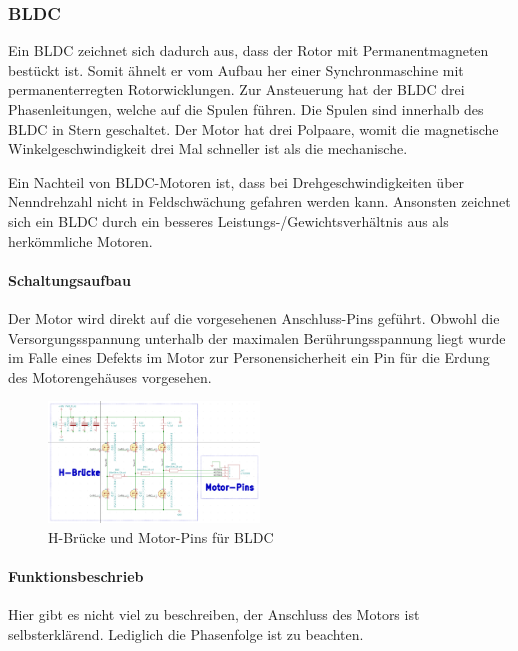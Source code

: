 \subsubsection{BLDC}
\label{subsubsec:BLDC}

Ein BLDC zeichnet sich dadurch aus, dass der Rotor mit Permanentmagneten bestückt ist. Somit ähnelt er vom Aufbau her einer Synchronmaschine mit permanenterregten Rotorwicklungen. Zur Ansteuerung hat der BLDC drei Phasenleitungen, welche auf die Spulen führen. Die Spulen sind innerhalb des BLDC in Stern geschaltet. Der Motor hat drei Polpaare, womit die magnetische Winkelgeschwindigkeit drei Mal schneller ist als die mechanische.

Ein Nachteil von BLDC-Motoren ist, dass bei Drehgeschwindigkeiten über Nenndrehzahl nicht in Feldschwächung gefahren werden kann. Ansonsten zeichnet sich ein BLDC durch ein besseres Leistungs-/Gewichtsverhältnis aus als herkömmliche Motoren.

\paragraph{Schaltungsaufbau}\mbox{}

Der Motor wird direkt auf die vorgesehenen Anschluss-Pins geführt. Obwohl die Versorgungsspannung unterhalb der maximalen Berührungsspannung liegt wurde im Falle eines Defekts im Motor zur Personensicherheit ein Pin für die Erdung des Motorengehäuses vorgesehen.

\begin{figure}[h!]
	\centering
	\includegraphics[width=0.5\textwidth]{graphics/Schema_H_Bruecke_und_BLDC}
	\caption{H-Brücke und Motor-Pins für BLDC}
	\label{fig:Schema_H_Bruecke_und_BLDC}
\end{figure}

\newpage

\paragraph{Funktionsbeschrieb}

Hier gibt es nicht viel zu beschreiben, der Anschluss des Motors ist selbsterklärend. Lediglich die Phasenfolge ist zu beachten.

